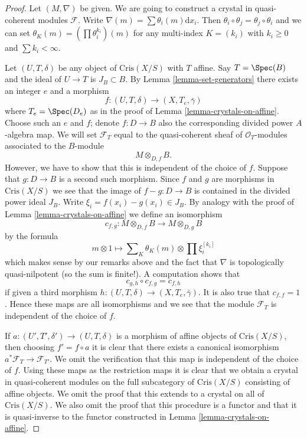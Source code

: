 \begin{proof}
Let $(M, \nabla)$ be given. We are going to construct
a crystal in quasi-coherent modules $\mathcal{F}$.
Write $\nabla(m) = \sum \theta_i(m)\text{d}x_i$.
Then $\theta_i \circ \theta_j = \theta_j \circ \theta_i$ and we
can set $\theta_K(m) = (\prod \theta_i^{k_i})(m)$ for any multi-index
$K = (k_i)$ with $k_i \geq 0$ and $\sum k_i < \infty$.

\medskip\noindent
Let $(U, T, \delta)$ be any object of $\text{Cris}(X/S)$ with $T$ affine.
Say $T = \Spec(B)$ and the ideal of $U \to T$ is $J_B \subset B$.
By Lemma \ref{lemma-set-generators} there exists an integer $e$ and a morphism
$$
f : (U, T, \delta) \longrightarrow (X, T_e, \bar\gamma)
$$
where $T_e = \Spec(D_e)$ as in the proof of
Lemma \ref{lemma-crystals-on-affine}.
Choose such an $e$ and $f$; denote $f : D \to B$ also the corresponding
divided power $A$-algebra map. We will set $\mathcal{F}_T$ equal to the
quasi-coherent sheaf of $\mathcal{O}_T$-modules associated to the $B$-module
$$
M \otimes_{D, f} B.
$$
However, we have to show that this is independent of the choice of $f$.
Suppose that $g : D \to B$ is a second such morphism. Since $f$ and $g$
are morphisms in $\text{Cris}(X/S)$ we see that the image of
$f - g : D \to B$ is contained in the divided power ideal $J_B$.
Write $\xi_i = f(x_i) - g(x_i) \in J_B$. By analogy with the proof
of Lemma \ref{lemma-crystals-on-affine} we define an isomorphism
$$
c_{f, g} : M \otimes_{D, f} B \longrightarrow M \otimes_{D, g} B
$$
by the formula
$$
m \otimes 1 \longmapsto 
\sum\nolimits_K \theta_K(m) \otimes \prod \xi_i^{[k_i]}
$$
which makes sense by our remarks above and the fact that $\nabla$
is topologically quasi-nilpotent (so the sum is finite!).
A computation shows that
$$
c_{g, h} \circ c_{f, g} = c_{f, h}
$$
if given a third morphism
$h : (U, T, \delta) \longrightarrow (X, T_e, \bar\gamma)$.
It is also true that $c_{f, f} = 1$.
Hence these maps are all isomorphisms and we see that
the module $\mathcal{F}_T$ is independent of the choice of $f$.

\medskip\noindent
If $a : (U', T', \delta') \to (U, T, \delta)$ is a morphism of affine objects
of $\text{Cris}(X/S)$, then choosing $f' = f \circ a$ it is clear
that there exists a canonical isomorphism
$a^*\mathcal{F}_T \to \mathcal{F}_{T'}$. We omit the verification that this
map is independent of the choice of $f$. Using these maps as the restriction
maps it is clear that we obtain a crystal in quasi-coherent modules
on the full subcategory of $\text{Cris}(X/S)$ consisting of affine objects.
We omit the proof that this extends to a crystal on all of
$\text{Cris}(X/S)$. We also omit the proof that this procedure is a functor
and that it is quasi-inverse to the functor constructed in
Lemma \ref{lemma-crystals-on-affine}.
\end{proof}

